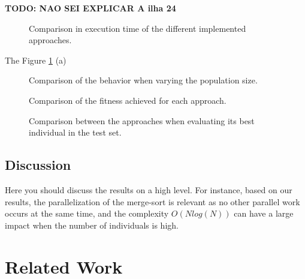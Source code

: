 \documentclass[runningheads]{llncs}
\begin{document}
\textbf{TODO: NAO SEI EXPLICAR A ilha 24}

\begin{figure}[H]
\centering

%
\qquad
{}%
\caption{Comparison in execution time of the different implemented approaches.} \label{comparacaolinear}
\label{comparacaoImpl}%
\end{figure}

The Figure \ref{comparacaoImpl} (a)


\begin{figure}[htbp]
\centering
{}
\caption{Comparison of the behavior when varying the population size.} \label{comparacaopopulacao}
\end{figure}

\begin{figure}[htbp]
\centering
{}
\caption{Comparison of the fitness achieved for each approach.} \label{comparacaofitness}
\end{figure}

\begin{figure}[htbp]
\centering
{}
\caption{Comparison between the approaches when evaluating its best individual in the test set.} \label{comparacaoerros}
\end{figure}

\subsection{Discussion}

Here you should discuss the results on a high level. For instance, based on our results, the parallelization of the merge-sort is relevant as no other parallel work occurs at the same time, and the complexity $O(N log(N))$ can have a large impact when the number of individuals is high.

\section{Related Work}
\end{document}
